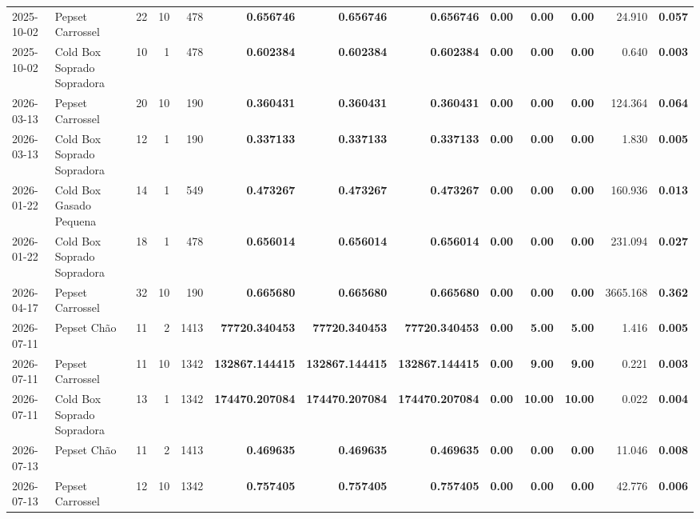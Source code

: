 {\begin{center}
{\begin{tabular}{@{}llrrrrrrrrrrr@{}}
2025-10-02 & Pepset Carrossel & 22 & 10 & 478 & \textbf{0.656746} & \textbf{0.656746} & \textbf{0.656746} & \textbf{0.00} & \textbf{0.00} & \textbf{0.00} & 24.910 & \textbf{0.057} \\
2025-10-02 & Cold Box Soprado Sopradora & 10 & 1 & 478 & \textbf{0.602384} & \textbf{0.602384} & \textbf{0.602384} & \textbf{0.00} & \textbf{0.00} & \textbf{0.00} & 0.640 & \textbf{0.003} \\
2026-03-13 & Pepset Carrossel & 20 & 10 & 190 & \textbf{0.360431} & \textbf{0.360431} & \textbf{0.360431} & \textbf{0.00} & \textbf{0.00} & \textbf{0.00} & 124.364 & \textbf{0.064} \\
2026-03-13 & Cold Box Soprado Sopradora & 12 & 1 & 190 & \textbf{0.337133} & \textbf{0.337133} & \textbf{0.337133} & \textbf{0.00} & \textbf{0.00} & \textbf{0.00} & 1.830 & \textbf{0.005} \\
2026-01-22 & Cold Box Gasado Pequena & 14 & 1 & 549 & \textbf{0.473267} & \textbf{0.473267} & \textbf{0.473267} & \textbf{0.00} & \textbf{0.00} & \textbf{0.00} & 160.936 & \textbf{0.013} \\
2026-01-22 & Cold Box Soprado Sopradora & 18 & 1 & 478 & \textbf{0.656014} & \textbf{0.656014} & \textbf{0.656014} & \textbf{0.00} & \textbf{0.00} & \textbf{0.00} & 231.094 & \textbf{0.027} \\
2026-04-17 & Pepset Carrossel & 32 & 10 & 190 & \textbf{0.665680} & \textbf{0.665680} & \textbf{0.665680} & \textbf{0.00} & \textbf{0.00} & \textbf{0.00} & 3665.168 & \textbf{0.362} \\
2026-07-11 & Pepset Chão & 11 & 2 & 1413 & \textbf{77720.340453} & \textbf{77720.340453} & \textbf{77720.340453} & \textbf{0.00} & \textbf{5.00} & \textbf{5.00} & 1.416 & \textbf{0.005} \\
2026-07-11 & Pepset Carrossel & 11 & 10 & 1342 & \textbf{132867.144415} & \textbf{132867.144415} & \textbf{132867.144415} & \textbf{0.00} & \textbf{9.00} & \textbf{9.00} & 0.221 & \textbf{0.003} \\
2026-07-11 & Cold Box Soprado Sopradora & 13 & 1 & 1342 & \textbf{174470.207084} & \textbf{174470.207084} & \textbf{174470.207084} & \textbf{0.00} & \textbf{10.00} & \textbf{10.00} & 0.022 & \textbf{0.004} \\
2026-07-13 & Pepset Chão & 11 & 2 & 1413 & \textbf{0.469635} & \textbf{0.469635} & \textbf{0.469635} & \textbf{0.00} & \textbf{0.00} & \textbf{0.00} & 11.046 & \textbf{0.008} \\
2026-07-13 & Pepset Carrossel & 12 & 10 & 1342 & \textbf{0.757405} & \textbf{0.757405} & \textbf{0.757405} & \textbf{0.00} & \textbf{0.00} & \textbf{0.00} & 42.776 & \textbf{0.006} \\

\end{tabular}}
\end{center}}
